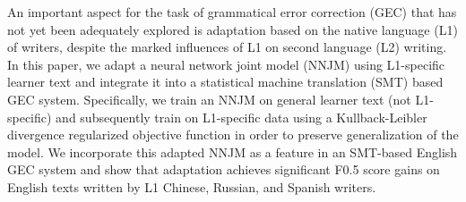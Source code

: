 An important aspect for the task of grammatical error correction (GEC) that has not yet been adequately explored is adaptation based on the native language (L1) of writers, despite the marked influences of L1 on second language (L2) writing.  In this paper, we adapt a neural network joint model (NNJM) using L1-specific learner text and integrate it into a statistical machine translation (SMT) based GEC system. Specifically, we train an NNJM on general learner text (not L1-specific) and subsequently train on L1-specific data using a Kullback-Leibler divergence regularized objective function in order to preserve generalization of the model. We incorporate this adapted NNJM as a feature in an SMT-based English GEC system and show that adaptation achieves significant F0.5 score gains on English texts written by L1 Chinese, Russian, and Spanish writers.
